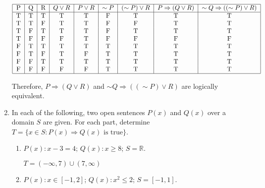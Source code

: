\documentclass[10pt]{article} %
\newcommand{\R}{\mathbb{R}}
\begin{document}
\begin{enumerate}
\begin{equation*}
 \begin{tabular}{|c|c|c|c|c|c|c|c|c|}\hline
 P & Q & R & $Q \vee R$ &  $P\vee R$  &  $\sim P$ & $(\sim P) \vee R$ & $P \Rightarrow (Q \vee R)$ & $\sim Q \Rightarrow ((\sim P) \vee R)$   \\ \hline
 T & T & T & T          &  T          &  F        & T                 & T                          & T  \\
 T & T & F & T          &  T          &  F        & F                 & T                          & T  \\
 T & F & T & T          &  T          &  F        & T                 & T                          & T  \\
 T & F & F & F          &  T          &  F        & F                 & F                          & F  \\
 F & T & T & T          &  T          &  T        & T                 & T                          & T  \\
 F & T & F & T          &  F          &  T        & T                 & T                          & T  \\
 F & F & T & T          &  T          &  T        & T                 & T                          & T  \\
 F & F & F & F          &  F          &  T        & T                 & T                          & T  \\ \hline
  \end{tabular}
 \end{equation*}
 
 Therefore, $P \Rightarrow (Q \vee R)$ and $\sim Q \Rightarrow ((\sim P) \vee R)$ are logically equivalent.  

\bigskip

 \item In each of the following, two open sentences $P(x)$ and $Q(x)$ over a domain $S$ are given.  For each part, determine $T = \{x \in S : P(x)\Rightarrow Q(x) \text{ is true}\}$.
 \begin{enumerate}
 \item $P(x):x-3=4$; \;\; $Q(x): x\ge 8$; \;\;  $S=\R$.
 
 \bigskip
 
   $T = (- \infty, 7) \cup (7, \infty)$
 
 \bigskip
 
 \item $P(x): x\in [-1,2]$; \;\;  $Q(x): x^2\le 2$; \;\;  $S=[-1,1]$.
 

\end{enumerate}
\end{enumerate}
\end{document}
